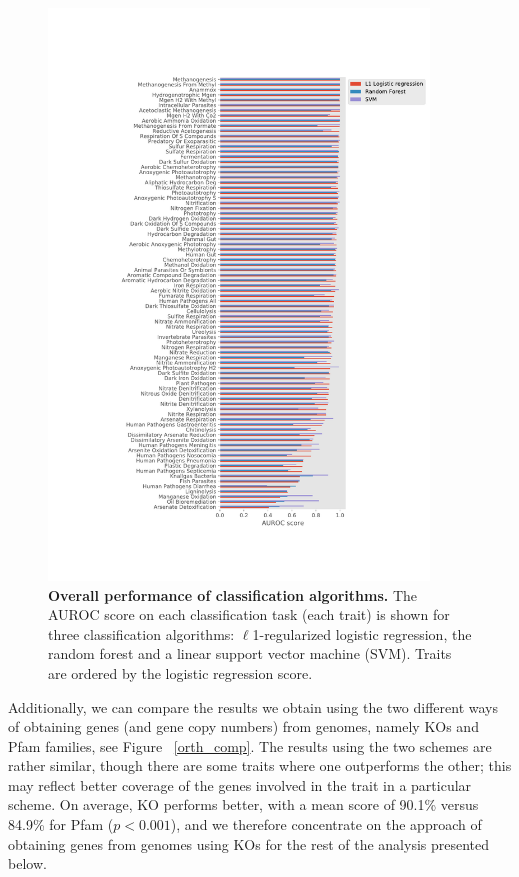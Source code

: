 \documentclass[10pt,letterpaper]{article}
\begin{document}
\begin{figure}[!h]
\includegraphics[width=0.9\textwidth]{fig1}
\caption{{\bf Overall performance of classification algorithms.}
The AUROC score on each classification task (each trait) is shown for three classification algorithms: $\ell$1-regularized logistic regression, the random forest and a linear support vector machine (SVM). Traits are ordered by the logistic regression score.}
\label{fig1}
\end{figure}

Additionally, we can compare the results we obtain using the two different ways of obtaining genes (and gene copy numbers) from genomes, namely KOs and Pfam families, see Figure ~\ref{orth_comp}. The results using the two schemes are rather similar, though there are some traits where one outperforms the other; this may reflect better coverage of the genes involved in the trait in a particular scheme. On average, KO performs better, with a mean score of 90.1\% versus 84.9\% for Pfam ($p<0.001$), and we therefore concentrate on the approach of obtaining genes from genomes using KOs for the rest of the analysis presented below.
\end{document}
